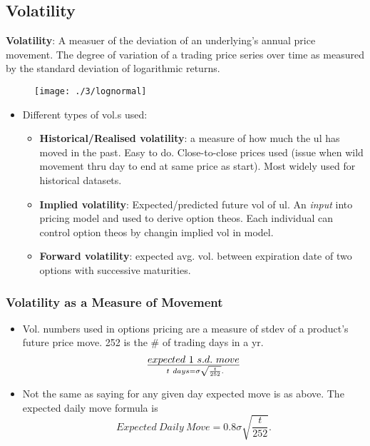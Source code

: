 \documentclass{article}
\begin{document}
\subsection*{Volatility}
\textbf{Volatility}: A measuer of the deviation of an underlying's annual price
movement. The degree of variation of a trading price series over time as
measured by the standard deviation of logarithmic returns.

\begin{figure}[h]
    \texttt{[image: ./3/lognormal]}
    \centering
\end{figure}

\begin{itemize}
    \item Different types of vol.s used:
    \begin{itemize}
        \item \textbf{Historical/Realised volatility}: a measure of how much the
        ul has moved in the past. Easy to do. Close-to-close prices used (issue
        when wild movement thru day to end at same price as start). Most widely
        used for historical datasets.
        \item \textbf{Implied volatility}: Expected/predicted future vol of ul.
        An \textit{input} into pricing model and used to derive option theos.
        Each individual can control option theos by changin implied vol in
        model.
        \item \textbf{Forward volatility}: expected avg. vol. between expiration
        date of two options with successive maturities.
    \end{itemize}
\end{itemize}

\subsubsection{Volatility as a Measure of Movement}
\begin{itemize}
    \item Vol. numbers used in options pricing are a measure of stdev of a
    product's future price move. 252 is the \# of trading days in a yr.
    \begin{equation*}
        expected \ 1 \ s.d. \ move \over \ t \ days = \sigma \sqrt{\frac{t}{252}}.
    \end{equation*}
    \item Not the same as saying for any given day expected move is as above.
    The expected daily move formula is
    \begin{equation*}
        Expected \ Daily \ Move = 0.8\sigma \sqrt{\frac{t}{252}}.
    \end{equation*}
\end{itemize}
\end{document}
